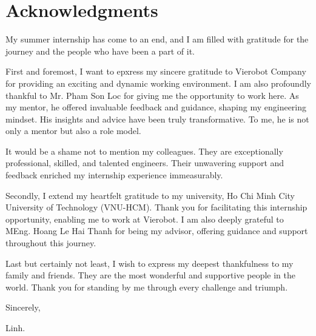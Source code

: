\section*{Acknowledgments}

My summer internship has come to an end, and I am filled with gratitude for the journey and the people who have been a part of it.

First and foremost, I want to epxress my sincere gratitude to Vierobot Company for providing an exciting and dynamic working environment. I am also profoundly thankful to Mr. Pham Son Loc for giving me the opportunity to work here. As my mentor, he offered invaluable feedback and guidance, shaping my engineering mindset. His insights and advice have been truly transformative. To me, he is not only a mentor but also a role model.

It would be a shame not to mention my colleagues. They are exceptionally professional, skilled, and talented engineers. Their unwavering support and feedback enriched my internship experience immeasurably.

Secondly, I extend my heartfelt gratitude to my university, Ho Chi Minh City University of Technology (VNU-HCM). Thank you for facilitating this internship opportunity, enabling me to work at Vierobot. I am also deeply grateful to MEng. Hoang Le Hai Thanh for being my advisor, offering guidance and support throughout this journey.

Last but certainly not least, I wish to express my deepest thankfulness to my family and friends. They are the most wonderful and supportive people in the world. Thank you for standing by me through every challenge and triumph.

Sincerely,

Linh.
